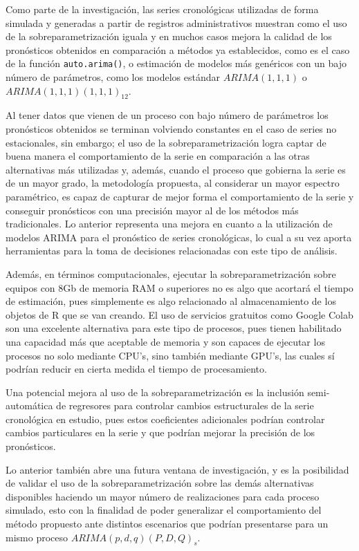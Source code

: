 \documentclass[
]{article}
\begin{document}
Como parte de la investigación, las series cronológicas utilizadas de
forma simulada y generadas a partir de registros administrativos
muestran como el uso de la sobreparametrización iguala y en muchos casos
mejora la calidad de los pronósticos obtenidos en comparación a métodos
ya establecidos, como es el caso de la función \texttt{auto.arima()}, o
estimación de modelos más genéricos con un bajo número de parámetros,
como los modelos estándar \(ARIMA(1,1,1)\) o
\(ARIMA(1,1,1)(1,1,1)_{12}\).

Al tener datos que vienen de un proceso con bajo número de parámetros
los pronósticos obtenidos se terminan volviendo constantes en el caso de
series no estacionales, sin embargo; el uso de la sobreparametrización
logra captar de buena manera el comportamiento de la serie en
comparación a las otras alternativas más utilizadas y, además, cuando el
proceso que gobierna la serie es de un mayor grado, la metodología
propuesta, al considerar un mayor espectro paramétrico, es capaz de
capturar de mejor forma el comportamiento de la serie y conseguir
pronósticos con una precisión mayor al de los métodos más tradicionales.
Lo anterior representa una mejora en cuanto a la utilización de modelos
ARIMA para el pronóstico de series cronológicas, lo cual a su vez aporta
herramientas para la toma de decisiones relacionadas con este tipo de
análisis.

Además, en términos computacionales, ejecutar la sobreparametrización
sobre equipos con 8Gb de memoria RAM o superiores no es algo que
acortará el tiempo de estimación, pues simplemente es algo relacionado
al almacenamiento de los objetos de R que se van creando. El uso de
servicios gratuitos como Google Colab son una excelente alternativa para
este tipo de procesos, pues tienen habilitado una capacidad más que
aceptable de memoria y son capaces de ejecutar los procesos no solo
mediante CPU's, sino también mediante GPU's, las cuales sí podrían
reducir en cierta medida el tiempo de procesamiento.

Una potencial mejora al uso de la sobreparametrización es la inclusión
semi-automática de regresores para controlar cambios estructurales de la
serie cronológica en estudio, pues estos coeficientes adicionales
podrían controlar cambios particulares en la serie y que podrían mejorar
la precisión de los pronósticos.

Lo anterior también abre una futura ventana de investigación, y es la
posibilidad de validar el uso de la sobreparametrización sobre las demás
alternativas disponibles haciendo un mayor número de realizaciones para
cada proceso simulado, esto con la finalidad de poder generalizar el
comportamiento del método propuesto ante distintos escenarios que
podrían presentarse para un mismo proceso \(ARIMA(p,d,q)(P,D,Q)_s\).
\end{document}
